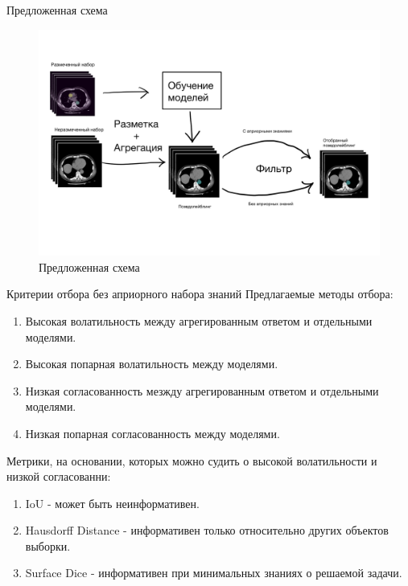 \documentclass[10pt]{beamer}
\theoremstyle{definition}
\begin{document}
	\begin{frame}{Предложенная схема}
            \begin{figure}
                \centering
                \includegraphics[width=0.9\linewidth]{image3.png}
                \caption{Предложенная схема}
                \label{fig:pseudo-labeling-label}
            \end{figure}
	\end{frame}	
    
        \begin{frame}{Критерии отбора без априорного набора знаний}
            Предлагаемые методы отбора:
            \begin{enumerate}
                \item Высокая волатильность между агрегированным ответом и отдельными моделями.
                \item Высокая попарная волатильность между моделями.
                \item Низкая согласованность мезжду агрегированным ответом и отдельными моделями.
                \item Низкая попарная согласованность между моделями. 
            \end{enumerate}
            Метрики, на основании, которых можно судить о высокой волатильности и низкой согласованни: 
            \begin{enumerate}
                \item IoU - может быть неинформативен.
                \item Hausdorff Distance - информативен только относительно других объектов выборки.
                \item Surface Dice - информативен при минимальных знаниях о решаемой задачи.
            \end{enumerate}
        \end{frame}
\end{document}
